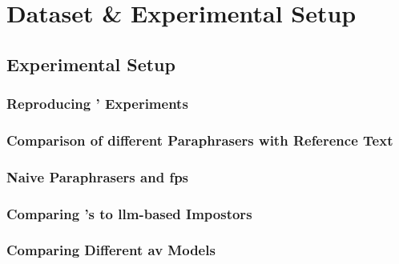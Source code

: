 \chapter{Dataset \& Experimental Setup}
\label{chap:dataset_experimental_setup}




\section{Experimental Setup}
\label{sec:experimental_setup}

\subsection{Reproducing \citet{koppel_determining_2014}' Experiments}



\subsection{Comparison of different Paraphrasers with Reference Text}

\subsection{Naive Paraphrasers and \acp{fp}}

\subsection{Comparing \citet{koppel_determining_2014}'s to \ac{llm}-based Impostors}

\subsection{Comparing Different \ac{av} Models}





